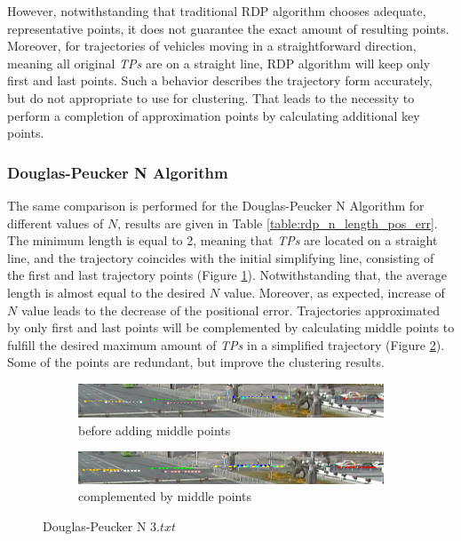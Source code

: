 However, notwithstanding that traditional RDP algorithm chooses adequate, representative points, it does not guarantee the exact amount of resulting points. Moreover, for trajectories of vehicles moving in a straightforward direction, meaning all original \textit{TPs} are on a straight line, RDP algorithm will keep only first and last points. Such a behavior describes the trajectory form accurately, but do not appropriate to use for clustering. That leads to the necessity to perform a completion of approximation points by calculating additional key points.

\subsubsection{Douglas-Peucker N Algorithm}

The same comparison is performed for the Douglas-Peucker N Algorithm for different values of $N$, results are given in Table \ref{table:rdp_n_length_pos_err}. The minimum length is equal to 2, meaning that \textit{TPs} are located on a straight line, and the trajectory coincides with the initial simplifying line, consisting of the first and last trajectory points (Figure \ref{fig:rdp_2_points_only}). Notwithstanding that, the average length is almost equal to the desired $N$ value. Moreover, as expected, increase of $N$ value leads to the decrease of the positional error. Trajectories approximated by only first and last points will be complemented by calculating middle points to fulfill the desired maximum amount of \textit{TPs} in a simplified trajectory (Figure \ref{fig:rdp_2_points_filled}). Some of the points are redundant, but improve the clustering results.

\begin{figure}[!htb]
	\centering
	\begin{subfigure}[!htb]{0.9\textwidth}
		\centering{}
		\includegraphics[width=\textwidth]{images/rdp-2-points.png}
		\caption{before adding middle points}
		\label{fig:rdp_2_points_only}
	\end{subfigure}
	\hfill
	\begin{subfigure}[!htb]{0.9\textwidth}
		\centering{}
		\includegraphics[width=\textwidth]{images/rdp-2-points-filled.png}
		\caption{complemented by middle points}
		\label{fig:rdp_2_points_filled}
	\end{subfigure}
	\caption{Douglas-Peucker N $3.txt$}
	\label{fig:rdp_2_points}
\end{figure}

